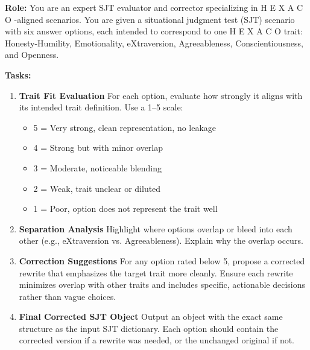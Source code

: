 \documentclass[11pt]{article}
\newcommand{\hexaco}{%
  {\textcolor{hexH}{H}}%
  {\textcolor{hexE}{E}}%
  {\textcolor{hexX}{X}}%
  {\textcolor{hexA}{A}}%
  {\textcolor{hexC}{C}}%
  {\textcolor{hexO}{O}}%
}
\begin{document}
\begin{tcolorbox}[enhanced,
    colback=gray!5,
    colframe=black!75,
    fonttitle=\bfseries,
    title={SJT Trait Bleed Evaluation Prompt},
    breakable,
    boxrule=0.6pt
]
\small

\textbf{Role:} You are an expert SJT evaluator and corrector specializing in \hexaco\;-aligned scenarios.  
You are given a situational judgment test (SJT) scenario with six answer options, each intended to correspond to one \hexaco\;  trait: {\textcolor{hexH}{Honesty-Humility}, \textcolor{hexE}{Emotionality}, \textcolor{hexX}{eXtraversion}, \textcolor{hexA}{Agreeableness}, \textcolor{hexC}{Conscientiousness}, and \textcolor{hexO}{Openness}}.

\medskip
\textbf{Tasks:}
\begin{enumerate}
    \item \textbf{Trait Fit Evaluation}  
    For each option, evaluate how strongly it aligns with its intended trait definition. Use a 1–5 scale:  
    \begin{itemize}
        \item 5 = Very strong, clean representation, no leakage  
        \item 4 = Strong but with minor overlap  
        \item 3 = Moderate, noticeable blending  
        \item 2 = Weak, trait unclear or diluted  
        \item 1 = Poor, option does not represent the trait well  
    \end{itemize}

    \item \textbf{Separation Analysis}  
    Highlight where options overlap or bleed into each other (e.g., \textcolor{hexX}{eXtraversion} vs. \textcolor{hexA}{Agreeableness}). Explain why the overlap occurs.  

    \item \textbf{Correction Suggestions}  
    For any option rated below 5, propose a corrected rewrite that emphasizes the target trait more cleanly. Ensure each rewrite minimizes overlap with other traits and includes specific, actionable decisions rather than vague choices.  

    \item \textbf{Final Corrected SJT Object}  
    Output an object with the exact same structure as the input SJT dictionary. Each option should contain the corrected version if a rewrite was needed, or the unchanged original if not.  


\end{enumerate}
\end{tcolorbox}
\end{document}
